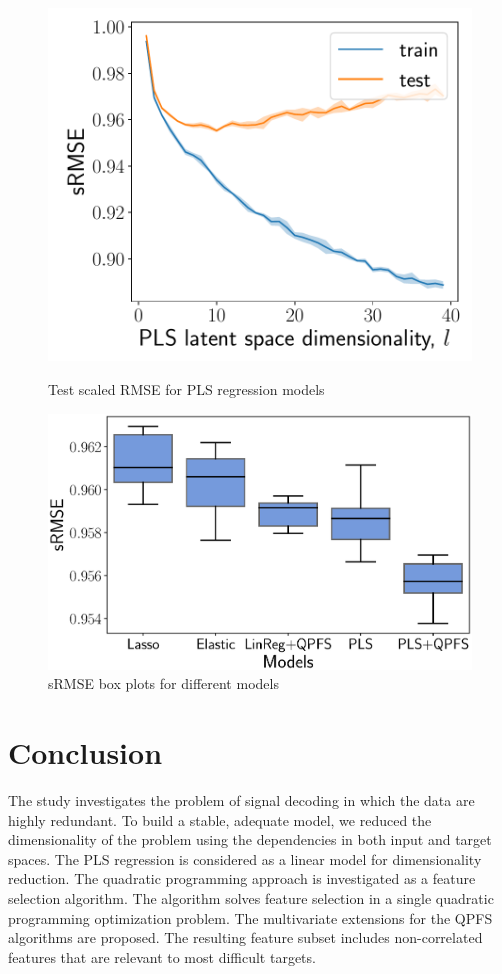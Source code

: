 \documentclass[preprint,authoryear,12pt]{elsarticle}
\theoremstyle{definition}
\begin{document}
\begin{figure}[h]
	\begin{minipage}{.41\linewidth}
		\centering
		\includegraphics[width=1.\linewidth]{figs/pls_vs_k}
		\caption{Test scaled RMSE for PLS regression models}
		\label{fig:pls_vs_k}
	\end{minipage}%
	\begin{minipage}{.57\linewidth}
		\centering
		\includegraphics[width=1.\linewidth]{figs/models2}
		\caption{sRMSE box plots for different models}
		\label{fig:models}
	\end{minipage}
\end{figure}

\section{Conclusion}
The study investigates the problem of signal decoding in which the data are highly redundant.
To build a stable, adequate model, we reduced the dimensionality of the problem using the dependencies in both input and target spaces.
The PLS regression is considered as a linear model for dimensionality reduction.
The quadratic programming approach is investigated as a feature selection algorithm.
The algorithm solves feature selection in a single quadratic programming optimization problem.
The multivariate extensions for the QPFS algorithms are proposed.
The resulting feature subset includes non-correlated features that are relevant to most difficult targets.
\end{document}
